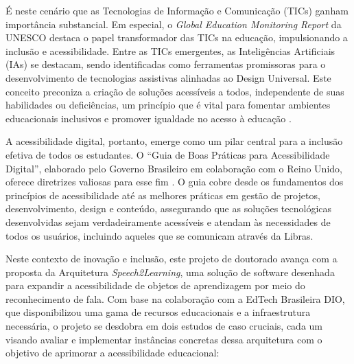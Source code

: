 É neste cenário que as Tecnologias de Informação e Comunicação (TICs) ganham importância substancial. Em especial, o \textit{Global Education Monitoring Report} da UNESCO destaca o papel transformador das TICs na educação, impulsionando a inclusão e acessibilidade. Entre as TICs emergentes, as Inteligências Artificiais (IAs) se destacam, sendo identificadas como ferramentas promissoras para o desenvolvimento de tecnologias assistivas alinhadas ao Design Universal. Este conceito preconiza a criação de soluções acessíveis a todos, independente de suas habilidades ou deficiências, um princípio que é vital para fomentar ambientes educacionais inclusivos e promover igualdade no acesso à educação \cite{UNESCO2023}.

A acessibilidade digital, portanto, emerge como um pilar central para a inclusão efetiva de todos os estudantes. O ``Guia de Boas Práticas para Acessibilidade Digital'', elaborado pelo Governo Brasileiro em colaboração com o Reino Unido, oferece diretrizes valiosas para esse fim \cite{GovBr2023}. O guia cobre desde os fundamentos dos princípios de acessibilidade até as melhores práticas em gestão de projetos, desenvolvimento, design e conteúdo, assegurando que as soluções tecnológicas desenvolvidas sejam verdadeiramente acessíveis e atendam às necessidades de todos os usuários, incluindo aqueles que se comunicam através da Libras.

Neste contexto de inovação e inclusão, este projeto de doutorado avança com a proposta da Arquitetura \textit{Speech2Learning}, uma solução de software desenhada para expandir a acessibilidade de objetos de aprendizagem por meio do reconhecimento de fala. Com base na colaboração com a EdTech Brasileira DIO, que disponibilizou uma gama de recursos educacionais e a infraestrutura necessária, o projeto se desdobra em dois estudos de caso cruciais, cada um visando avaliar e implementar instâncias concretas dessa arquitetura com o objetivo de aprimorar a acessibilidade educacional:


